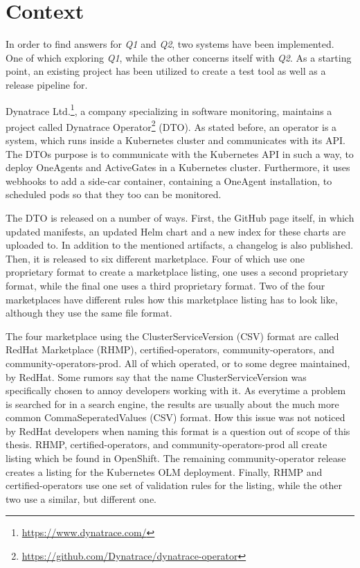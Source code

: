 \chapter{Context}\label{ch:context}

In order to find answers for \textit{Q1} and \textit{Q2}, two systems have been implemented.
One of which exploring \textit{Q1}, while the other concerns itself with \textit{Q2}.
As a starting point, an existing project has been utilized to create a test tool as well as a release pipeline for.

Dynatrace Ltd.\footnote{\url{https://www.dynatrace.com/}}, a company specializing in software monitoring, maintains a project called Dynatrace Operator\footnote{\url{https://github.com/Dynatrace/dynatrace-operator}} (DTO).
As stated before, an operator is a system, which runs inside a Kubernetes cluster and communicates with its API.
The DTOs purpose is to communicate with the Kubernetes API in such a way, to deploy OneAgents and ActiveGates in a Kubernetes cluster.
Furthermore, it uses webhooks to add a side-car container, containing a OneAgent installation, to scheduled pods so that they too can be monitored.

The DTO is released on a number of ways.
First, the GitHub page itself, in which updated manifests, an updated Helm chart and a new index for these charts are uploaded to.
In addition to the mentioned artifacts, a changelog is also published.
Then, it is released to six different marketplace.
Four of which use one proprietary format to create a marketplace listing, one uses a second proprietary format, while the final one uses a third proprietary format.
Two of the four marketplaces have different rules how this marketplace listing has to look like, although they use the same file format.

The four marketplace using the ClusterServiceVersion (CSV) format are called RedHat Marketplace (RHMP), certified-operators, community-operators, and community-operators-prod.
All of which operated, or to some degree maintained, by RedHat.
Some rumors say that the name ClusterServiceVersion was specifically chosen to annoy developers working with it.
As everytime a problem is searched for in a search engine, the results are usually about the much more common CommaSeperatedValues (CSV) format.
How this issue was not noticed by RedHat developers when naming this format is a question out of scope of this thesis.
RHMP, certified-operators, and community-operators-prod all create listing which be found in OpenShift.
The remaining community-operator release creates a listing for the Kubernetes OLM deployment.
Finally, RHMP and certified-operators use one set of validation rules for the listing, while the other two use a similar, but different one.

